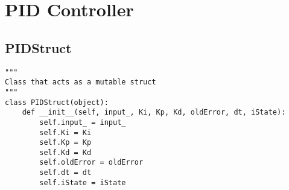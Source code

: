 \documentclass[11pt]{article}
\begin{document}
\section{PID Controller}
\label{sec:org8b156b3}
\subsection{PIDStruct}
\label{sec:org59a076c}

\begin{verbatim}
"""
Class that acts as a mutable struct
"""
class PIDStruct(object):
    def __init__(self, input_, Ki, Kp, Kd, oldError, dt, iState):
        self.input_ = input_
        self.Ki = Ki
        self.Kp = Kp
        self.Kd = Kd
        self.oldError = oldError
        self.dt = dt
        self.iState = iState
\end{verbatim}
\end{document}
